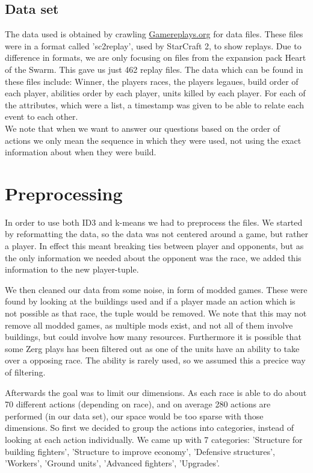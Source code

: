 \documentclass[a4paper,11pt]{article}
\begin{document}
\subsection{Data set}
The data used is obtained by crawling \url{Gamereplays.org} for data files.
These files were in a format called 'sc2replay', used by StarCraft 2, to show replays. Due to difference in formats, we are only focusing on files from the expansion pack Heart of the Swarm. This gave us just 462 replay files. The data which can be found in these files include: Winner, the players races, the players legaues, build order of each player, abilities order by each player, units killed by each player.
For each of the attributes, which were a list, a timestamp was given to be able to relate each event to each other.\\

We note that when we want to answer our questions based on the order of actions we only mean the sequence in which they were used, not using the exact information about when they were build.

\section{Preprocessing}
In order to use both ID3 and k-means we had to preprocess the files. We started by reformatting the data, so the data was not centered around a game, but rather a player.
In effect this meant breaking ties between player and opponents, but as the only information we needed about the opponent was the race, we added this information to the new player-tuple.

We then cleaned our data from some noise, in form of modded games. These were found by looking at the buildings used and if a player made an action which is not possible as that race, the tuple would be removed. We note that this may not remove all modded games, as multiple mods exist, and not all of them involve buildings, but could involve how many resources. Furthermore it is possible that some Zerg plays has been filtered out as one of the units have an ability to take over a opposing race. The ability is rarely used, so we assumed this a precice way of filtering.

Afterwards the goal was to limit our dimensions. As each race is able to do about 70 different actions (depending on race), and on average 280 actions are performed (in our data set), our space would be too sparse with those dimensions. So first we decided to group the actions into categories, instead of looking at each action individually. We came up with 7 categories: 'Structure for building fighters', 'Structure to improve economy', 'Defensive structures', 'Workers', 'Ground units', 'Advanced fighters', 'Upgrades'.
\end{document}
